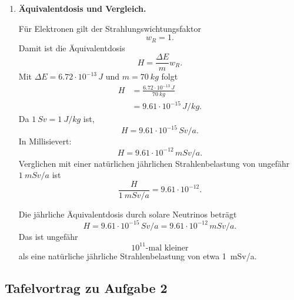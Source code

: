 \documentclass[11pt,a4paper]{scrartcl}
\theoremstyle{definition}
\theoremstyle{plain}
\theoremstyle{remark}
\begin{document}
\begin{enumerate}[label=(\alph*)]
    \begin{answerbox}
        Durch die Elektronen wird pro Jahr ungefähr
        \[
            \boxed{\Delta E_{\mathrm{Jahr}}=6.72\cdot10^{-13}\,\si{J}}
        \]
        im Körper abgegeben.
    \end{answerbox}

    \item \textbf{Äquivalentdosis und Vergleich.}

    \begin{calculationbox}
        Für Elektronen gilt der Strahlungswichtungsfaktor
        \[
            w_R=1.
        \]
        Damit ist die Äquivalentdosis
        \[
            H=\frac{\Delta E}{m}w_R.
        \]
        Mit $\Delta E=6.72\cdot10^{-13}\,\si{J}$ und $m=\SI{70}{kg}$ folgt
        \[
        \begin{aligned}
            H
            &=\frac{6.72\cdot10^{-13}\,\si{J}}{\SI{70}{kg}}\\
            &=9.61\cdot10^{-15}\,\si{J/kg}.
        \end{aligned}
        \]
        Da $\SI{1}{Sv}=\SI{1}{J/kg}$ ist,
        \[
            H=9.61\cdot10^{-15}\,\si{Sv/a}.
        \]
        In Millisievert:
        \[
            H=9.61\cdot10^{-12}\,\si{mSv/a}.
        \]
        Verglichen mit einer natürlichen jährlichen Strahlenbelastung von ungefähr $\SI{1}{mSv/a}$ ist
        \[
            \frac{H}{\SI{1}{mSv/a}}=9.61\cdot10^{-12}.
        \]
    \end{calculationbox}

    \begin{answerbox}
        Die jährliche Äquivalentdosis durch solare Neutrinos beträgt
        \[
            \boxed{H=9.61\cdot10^{-15}\,\si{Sv/a}=9.61\cdot10^{-12}\,\si{mSv/a}}.
        \]
        Das ist ungefähr
        \[
            \boxed{10^{11}\text{-mal kleiner}}
        \]
        als eine natürliche jährliche Strahlenbelastung von etwa \SI{1}{mSv/a}.
    \end{answerbox}
\end{enumerate}

\subsection{Tafelvortrag zu Aufgabe 2}
\end{document}
